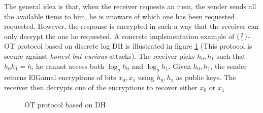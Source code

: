 The general idea is that, when the receiver requests an item, the sender sends
all the available items to him, he is unaware of which one has been requested
requested. However, the response is encrypted in such a way that the receiver
can only decrypt the one he requested. A concrete implementation example of
\(\begin{psmallmatrix} 2 \\ 1 \end{psmallmatrix} \)-OT protocol based on
discrete log DH is illustrated in figure \ref{fig:DH21OT} (This protocol is
secure against \textit{honest but curious} attacks). The receiver picks
\(h_{0},h_{1}\) such that \(h_{0}h_{1} = h\), he cannot access both
\(\log_{g}h_{0}\) and \(\log_{g}h_{1}\). Given \(h_{0}, h_{1}\), the sender
returns ElGamal encryptions of bits \(x_{0}, x_{1}\) using \(h_{0},h_{1}\) as
public keys. The receiver then decrypts one of the encryptions to recover either
\(x_{0} \text{ or } x_{1}\)

\begin{figure}[htbp!] 
  \centering
  \caption{OT protocol based on DH}
  \label{fig:DH21OT}
\end{figure}


